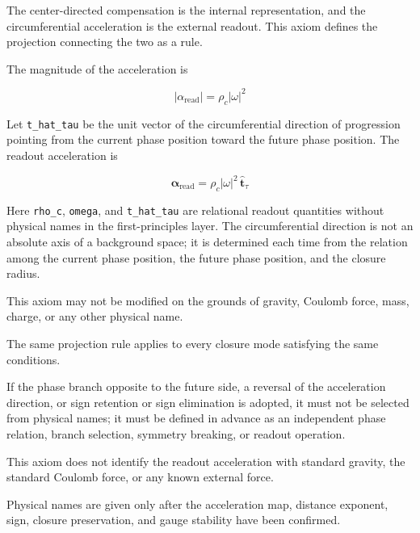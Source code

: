 \documentclass[
  a4paper,
]{article}
\begin{document}
The center-directed compensation is the internal representation, and the
circumferential acceleration is the external readout. This axiom defines
the projection connecting the two as a rule.

The magnitude of the acceleration is

\[
|\alpha_{\mathrm{read}}|
=\rho_c|\omega|^2
\]

Let \texttt{t\_hat\_tau} be the unit vector of the circumferential
direction of progression pointing from the current phase position toward
the future phase position. The readout acceleration is

\[
\boldsymbol{\alpha}_{\mathrm{read}}
=\rho_c|\omega|^2\,\hat{\boldsymbol{t}}_\tau
\]

Here \texttt{rho\_c}, \texttt{omega}, and \texttt{t\_hat\_tau} are
relational readout quantities without physical names in the
first-principles layer. The circumferential direction is not an absolute
axis of a background space; it is determined each time from the relation
among the current phase position, the future phase position, and the
closure radius.

This axiom may not be modified on the grounds of gravity, Coulomb force,
mass, charge, or any other physical name.

The same projection rule applies to every closure mode satisfying the
same conditions.

If the phase branch opposite to the future side, a reversal of the
acceleration direction, or sign retention or sign elimination is
adopted, it must not be selected from physical names; it must be defined
in advance as an independent phase relation, branch selection, symmetry
breaking, or readout operation.

This axiom does not identify the readout acceleration with standard
gravity, the standard Coulomb force, or any known external force.

Physical names are given only after the acceleration map, distance
exponent, sign, closure preservation, and gauge stability have been
confirmed.
\end{document}
